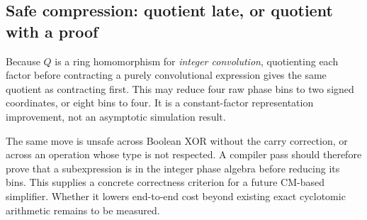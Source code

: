 \subsection{Safe compression: quotient late, or quotient with a proof}
Because $Q$ is a ring homomorphism for \emph{integer convolution}, quotienting each factor before contracting a purely convolutional expression gives the same quotient as contracting first. This may reduce four raw phase bins to two signed coordinates, or eight bins to four. It is a constant-factor representation improvement, not an asymptotic simulation result.

The same move is unsafe across Boolean XOR without the carry correction, or across an operation whose type is not respected. A compiler pass should therefore prove that a subexpression is in the integer phase algebra before reducing its bins. This supplies a concrete correctness criterion for a future CM-based simplifier. Whether it lowers end-to-end cost beyond existing exact cyclotomic arithmetic remains to be measured.

